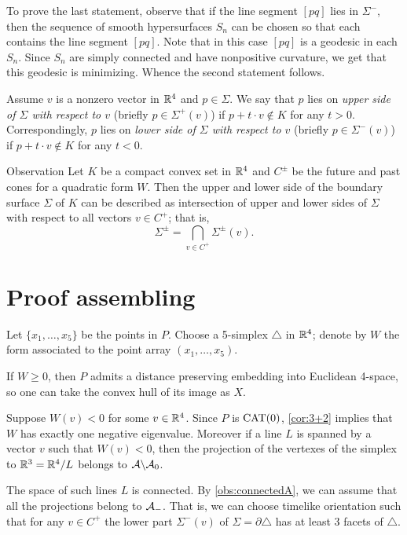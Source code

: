 \documentclass{article}
\begin{document}
To prove the last statement, observe that if the line segment $[pq]$ lies in $\Sigma^-$,
then the sequence of smooth hypersurfaces $S_n$ can be chosen so that each contains the line segment $[pq]$.
Note that in this case $[pq]$ is a geodesic in each $S_n$.
Since $S_n$ are simply connected and have nonpositive curvature, we get that this geodesic is minimizing.
Whence the second statement follows.
\qeds

Assume $v$ is a nonzero vector in $\mathbb{R}^4$ and $p\in\Sigma$.
We say that $p$ lies on \emph{upper side of $\Sigma$ with respect to $v$} (briefly $p\in \Sigma^+(v)$) if $p+t\cdot v\notin K$ for any $t>0$.
Correspondingly, $p$ lies on \emph{lower side of $\Sigma$ with respect to $v$} (briefly $p\in \Sigma^-(v)$) if $p+t\cdot v\notin K$ for any $t<0$.

\begin{thm}{Observation}\label{obs:Sigma(v)}
Let $K$ be a compact convex set in $\mathbb{R}^4$ and $C^\pm$ be the future and past cones for a quadratic form $W$.
Then the upper and lower side of the boundary surface $\Sigma$ of $K$ can be described as intersection of upper and lower sides of $\Sigma$ with respect to all vectors $v\in C^+$;
that is,
\[\Sigma^\pm=\bigcap_{v\in C^+}\Sigma^\pm(v).\]
\end{thm}

\section{Proof assembling}

Let $\{x_1,\dots,x_5\}$ be the points in $P$.
Choose a 5-simplex $\triangle$ in $\mathbb{R}^4$; denote by $W$ the form associated to the point array $(x_1,\dots,x_5)$.

If $W\ge0$, then $P$ admits a distance preserving embedding into Euclidean 4-space, so one can take the convex hull of its image as $X$.

Suppose $W(v)<0$ for some $v\in\mathbb{R}^4$.
Since $P$ is $\mathrm{CAT}(0)$, \ref{cor:3+2} implies that $W$ has exactly one negative eigenvalue.
Moreover if a line $L$ is spanned by a vector $v$ such that $W(v)<0$, then the projection of the vertexes of the simplex to $\mathbb{R}^3=\mathbb{R}^4/L$ belongs to $\mathcal{A}\backslash\mathcal{A}_0$.

The space of such lines $L$ is connected.
By \ref{obs:connectedA}, we can assume that all the projections belong to $\mathcal{A}_-$.
That is, we can choose timelike orientation such that for any $v\in C^+$ the lower part $\Sigma^-(v)$ of $\Sigma=\partial \triangle$ has at least 3 facets of $\triangle$.
\end{document}
